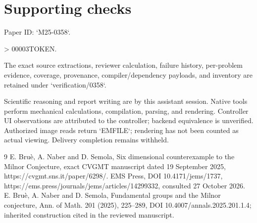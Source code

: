\documentclass[10pt]{article}
\begin{document}
\section*{Supporting checks}
Paper ID: `M25-0358`.\par
> 00003TOKEN.\par
The exact source extractions, reviewer calculation, failure history, per-problem evidence, coverage, provenance, compiler/dependency payloads, and inventory are retained under `verification/0358`.\par
Scientific reasoning and report writing are by this assistant session. Native tools perform mechanical calculations, compilation, parsing, and rendering. Controller UI observations are attributed to the controller; backend equivalence is unverified. Authorized image reads return `EMFILE`; rendering has not been counted as actual viewing. Delivery completion remains withheld.\par
9 E. Bruè, A. Naber and D. Semola, Six dimensional counterexample to the Milnor Conjecture, exact CVGMT manuscript dated 19 September 2025, https://cvgmt.sns.it/paper/6298/. EMS Press, DOI 10.4171/jems/1737, https://ems.press/journals/jems/articles/14299332, consulted 27 October 2026. E. Bruè, A. Naber and D. Semola, Fundamental groups and the Milnor conjecture, Ann. of Math. 201 (2025), 225–289, DOI 10.4007/annals.2025.201.1.4; inherited construction cited in the reviewed manuscript.\par
\end{document}
